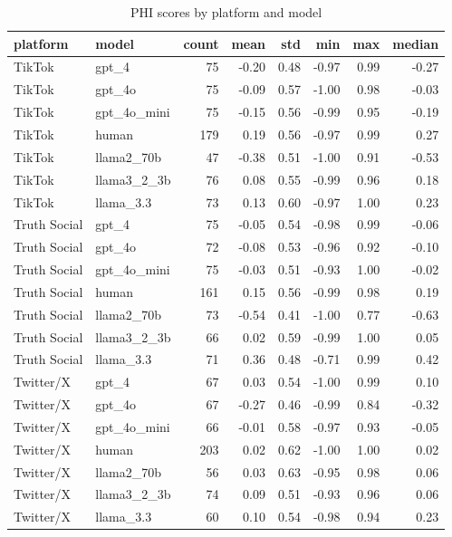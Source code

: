 \begin{table}

\caption{PHI scores by platform and model}
\centering
\begin{tabular}[t]{llrrrrrr}
\toprule
platform & model & count & mean & std & min & max & median\\
\midrule
TikTok & gpt\_4 & 75 & -0.20 & 0.48 & -0.97 & 0.99 & -0.27\\
TikTok & gpt\_4o & 75 & -0.09 & 0.57 & -1.00 & 0.98 & -0.03\\
TikTok & gpt\_4o\_mini & 75 & -0.15 & 0.56 & -0.99 & 0.95 & -0.19\\
TikTok & human & 179 & 0.19 & 0.56 & -0.97 & 0.99 & 0.27\\
TikTok & llama2\_70b & 47 & -0.38 & 0.51 & -1.00 & 0.91 & -0.53\\
\addlinespace
TikTok & llama3\_2\_3b & 76 & 0.08 & 0.55 & -0.99 & 0.96 & 0.18\\
TikTok & llama\_3.3 & 73 & 0.13 & 0.60 & -0.97 & 1.00 & 0.23\\
Truth Social & gpt\_4 & 75 & -0.05 & 0.54 & -0.98 & 0.99 & -0.06\\
Truth Social & gpt\_4o & 72 & -0.08 & 0.53 & -0.96 & 0.92 & -0.10\\
Truth Social & gpt\_4o\_mini & 75 & -0.03 & 0.51 & -0.93 & 1.00 & -0.02\\
\addlinespace
Truth Social & human & 161 & 0.15 & 0.56 & -0.99 & 0.98 & 0.19\\
Truth Social & llama2\_70b & 73 & -0.54 & 0.41 & -1.00 & 0.77 & -0.63\\
Truth Social & llama3\_2\_3b & 66 & 0.02 & 0.59 & -0.99 & 1.00 & 0.05\\
Truth Social & llama\_3.3 & 71 & 0.36 & 0.48 & -0.71 & 0.99 & 0.42\\
Twitter/X & gpt\_4 & 67 & 0.03 & 0.54 & -1.00 & 0.99 & 0.10\\
\addlinespace
Twitter/X & gpt\_4o & 67 & -0.27 & 0.46 & -0.99 & 0.84 & -0.32\\
Twitter/X & gpt\_4o\_mini & 66 & -0.01 & 0.58 & -0.97 & 0.93 & -0.05\\
Twitter/X & human & 203 & 0.02 & 0.62 & -1.00 & 1.00 & 0.02\\
Twitter/X & llama2\_70b & 56 & 0.03 & 0.63 & -0.95 & 0.98 & 0.06\\
Twitter/X & llama3\_2\_3b & 74 & 0.09 & 0.51 & -0.93 & 0.96 & 0.06\\
\addlinespace
Twitter/X & llama\_3.3 & 60 & 0.10 & 0.54 & -0.98 & 0.94 & 0.23\\

\end{tabular}
\end{table}
